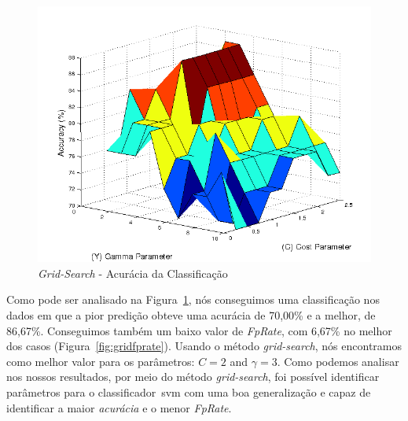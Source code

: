 \begin{figure}[!h]
 \centering
  \includegraphics[scale=0.7]{./img/gridsearch.png} 
  \caption{\textit{Grid-Search} - Acurácia da Classificação}
 \label{fig:gridaccuracy}
\end{figure}

 
Como pode ser analisado na Figura~\ref{fig:gridaccuracy}, nós conseguimos uma classificação nos dados em que a pior predição obteve uma acurácia de 70,00\% e a melhor, de 86,67\%. Conseguimos também um baixo valor de \textit{FpRate}, com 6,67\% no melhor dos casos (Figura~\ref{fig:gridfprate}). Usando o método \textit{grid-search}, nós encontramos como melhor valor para os parâmetros: $C = 2$ and $\gamma = 3$. Como podemos analisar nos nossos resultados, por meio do método \textit{grid-search}, foi possível identificar parâmetros para o classificador~\ac{svm} com uma boa generalização e capaz de identificar a maior \textit{acurácia} e o menor \textit{FpRate}.


